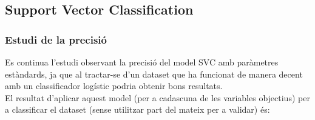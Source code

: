\documentclass[a4paper, 11pt]{article}
\begin{document}
\newpage



\subsection{Support Vector Classification}\label{SVC}
\subsubsection{Estudi de la precisió}
Es continua l'estudi observant la precisió del model SVC amb paràmetres estàndards, ja que al tractar-se d'un dataset que ha funcionat de manera decent amb un classificador logístic podria obtenir bons resultats.\\
El resultat d'aplicar aquest model (per a cadascuna de les variables objectius) per a classificar el dataset (sense utilitzar part del mateix per a validar) és:
\end{document}
